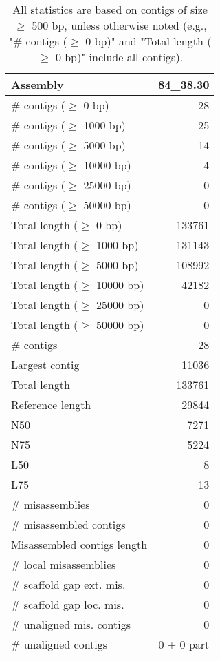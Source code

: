 \documentclass[12pt,a4paper]{article}
\begin{document}
\begin{table}[ht]
\begin{center}
\caption{All statistics are based on contigs of size $\geq$ 500 bp, unless otherwise noted (e.g., "\# contigs ($\geq$ 0 bp)" and "Total length ($\geq$ 0 bp)" include all contigs).}
\begin{tabular}{|l*{1}{|r}|}
\hline
Assembly & 84\_38.30 \\ \hline
\# contigs ($\geq$ 0 bp) & 28 \\ \hline
\# contigs ($\geq$ 1000 bp) & 25 \\ \hline
\# contigs ($\geq$ 5000 bp) & 14 \\ \hline
\# contigs ($\geq$ 10000 bp) & 4 \\ \hline
\# contigs ($\geq$ 25000 bp) & 0 \\ \hline
\# contigs ($\geq$ 50000 bp) & 0 \\ \hline
Total length ($\geq$ 0 bp) & 133761 \\ \hline
Total length ($\geq$ 1000 bp) & 131143 \\ \hline
Total length ($\geq$ 5000 bp) & 108992 \\ \hline
Total length ($\geq$ 10000 bp) & 42182 \\ \hline
Total length ($\geq$ 25000 bp) & 0 \\ \hline
Total length ($\geq$ 50000 bp) & 0 \\ \hline
\# contigs & 28 \\ \hline
Largest contig & 11036 \\ \hline
Total length & 133761 \\ \hline
Reference length & 29844 \\ \hline
N50 & 7271 \\ \hline
N75 & 5224 \\ \hline
L50 & 8 \\ \hline
L75 & 13 \\ \hline
\# misassemblies & 0 \\ \hline
\# misassembled contigs & 0 \\ \hline
Misassembled contigs length & 0 \\ \hline
\# local misassemblies & 0 \\ \hline
\# scaffold gap ext. mis. & 0 \\ \hline
\# scaffold gap loc. mis. & 0 \\ \hline
\# unaligned mis. contigs & 0 \\ \hline
\# unaligned contigs & 0 + 0 part \\ \hline

\end{tabular}
\end{center}
\end{table}
\end{document}
